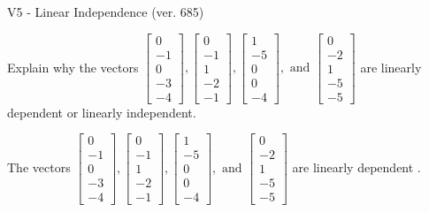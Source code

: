 \begin{exercise}
  \begin{exerciseTitle}V5 - Linear Independence (ver. 685)\end{exerciseTitle}
  \begin{exerciseStatement}
    Explain why the vectors \(\left[\begin{array}{r}
0 \\
-1 \\
0 \\
-3 \\
-4
\end{array}\right] , \left[\begin{array}{r}
0 \\
-1 \\
1 \\
-2 \\
-1
\end{array}\right] , \left[\begin{array}{r}
1 \\
-5 \\
0 \\
0 \\
-4
\end{array}\right] , \text{ and } \left[\begin{array}{r}
0 \\
-2 \\
1 \\
-5 \\
-5
\end{array}\right]\) are linearly dependent or linearly independent.	


  \end{exerciseStatement}
  \begin{exerciseAnswer}
   The vectors \(\left[\begin{array}{r}
0 \\
-1 \\
0 \\
-3 \\
-4
\end{array}\right] , \left[\begin{array}{r}
0 \\
-1 \\
1 \\
-2 \\
-1
\end{array}\right] , \left[\begin{array}{r}
1 \\
-5 \\
0 \\
0 \\
-4
\end{array}\right] , \text{ and } \left[\begin{array}{r}
0 \\
-2 \\
1 \\
-5 \\
-5
\end{array}\right]\) are 
  	 linearly dependent  .
  


  \end{exerciseAnswer}
\end{exercise}